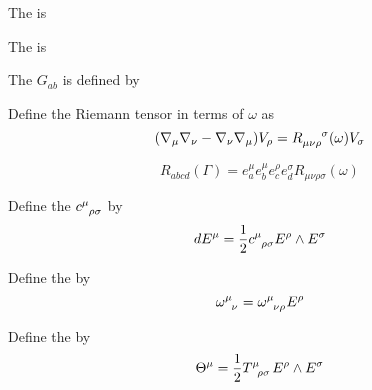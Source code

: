\documentclass{article}
\begin{document}
\begin{definition}
The  is 
\end{definition}

\begin{definition}
The  is 
\end{definition}

\begin{definition}
The  $G_{ab}$ is defined by 
\end{definition}

\begin{lemma}
\end{lemma}


\begin{definition}
Define the Riemann tensor in terms of $\omega$ as 
\[
(\nabla_\mu \nabla_\nu - \nabla_\nu \nabla_\mu ) V_\rho = R\indices{_\mu_\nu_\rho^\sigma}(\omega) V_\sigma
\]
\end{definition}

\begin{theorem}
\[
R_{abcd}(\Gamma) = e^\mu_a e^\mu_b e^\rho_c e^\sigma_d R_{\mu\nu\rho\sigma}(\omega)
\]
\end{theorem}

\begin{definition}
Define the  $c\indices{^\mu_\rho_\sigma}$ by 
\[
dE^\mu = \frac{1}{2} c\indices{^\mu_\rho_\sigma} E^\rho \wedge E^\sigma
\]
\end{definition}

\begin{lemma}
\end{lemma}

\begin{definition}
Define the  by 
\[
\omega\indices{^\mu_\nu} = \omega\indices{^\mu_\nu_\rho}E^\rho
\]
\end{definition}

\begin{definition}
Define the  by 
\[
\Theta^\mu = \frac{1}{2} T\indices{^\mu_\rho_\sigma} E^\rho \wedge E^\sigma
\]
\end{definition}
\end{document}
